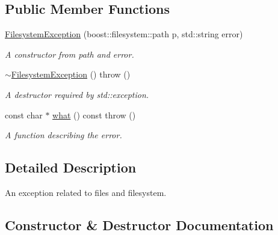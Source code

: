 \subsection*{Public Member Functions}
\begin{DoxyCompactItemize}
\item 
\hyperlink{class_r_c_f_1_1_common_1_1_filesystem_exception_adf2e36d11d37710eaea10aebde922f15}{Filesystem\+Exception} (boost\+::filesystem\+::path p, std\+::string error)
\begin{DoxyCompactList}\small\item\em A constructor from path and error. \end{DoxyCompactList}\item 
\hypertarget{class_r_c_f_1_1_common_1_1_filesystem_exception_a0824129ef3ec0388a6d22f797cacfc76}{}\hyperlink{class_r_c_f_1_1_common_1_1_filesystem_exception_a0824129ef3ec0388a6d22f797cacfc76}{$\sim$\+Filesystem\+Exception} ()  throw ()\label{class_r_c_f_1_1_common_1_1_filesystem_exception_a0824129ef3ec0388a6d22f797cacfc76}

\begin{DoxyCompactList}\small\item\em A destructor required by std\+::exception. \end{DoxyCompactList}\item 
const char $\ast$ \hyperlink{class_r_c_f_1_1_common_1_1_filesystem_exception_abec09541bb92502793fa8f9b014792ca}{what} () const   throw ()
\begin{DoxyCompactList}\small\item\em A function describing the error. \end{DoxyCompactList}\end{DoxyCompactItemize}


\subsection{Detailed Description}
An exception related to files and filesystem. 

\subsection{Constructor \& Destructor Documentation}
\hypertarget{class_r_c_f_1_1_common_1_1_filesystem_exception_adf2e36d11d37710eaea10aebde922f15}{}
